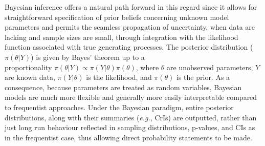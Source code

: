 \documentclass[12pt]{article}
\begin{document}
Bayesian inference offers a natural path forward in this regard since it allows for \\ straightforward specification of prior beliefs concerning unknown model parameters and permits the seamless propagation of uncertainty, when data are lacking and sample sizes are small, through integration with the likelihood function associated with true generating processes. The posterior distribution ($\pi(\theta | Y)$) is given by Bayes' theorem up to a \\ proportionality $\pi(\theta | Y) \propto \pi(Y | \theta)\pi(\theta)$, where $\theta$ are unobserved parameters, $Y$ are known data, $\pi(Y | \theta)$ is the likelihood, and $\pi(\theta)$ is the prior.  As a consequence, because parameters are treated as random variables, Bayesian models are much more flexible and generally more easily interpretable compared to frequentist approaches. Under the Bayesian paradigm, entire posterior distributions, along with their summaries (\textit{e.g.}, CrIs) are outputted, rather than just long run behaviour reflected in sampling distributions, p-values, and CIs as in the frequentist case, thus allowing direct probability statements to be made. 
\end{document}
